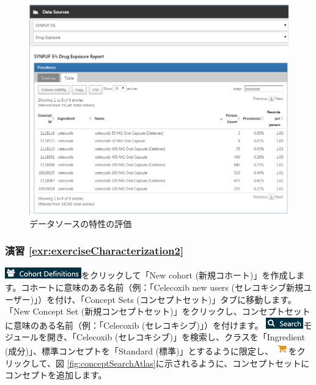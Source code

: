 \documentclass[
  11pt]{book}
\theoremstyle{definition}
\theoremstyle{definition}
\theoremstyle{definition}
\theoremstyle{definition}
\theoremstyle{remark}
\begin{document}
\begin{figure}

{\centering \includegraphics[width=1\linewidth]{images/SuggestedAnswers/dataSourcesAtlas} 

}

\caption{データソースの特性の評価}\label{fig:dataSourcesAtlas}
\end{figure}

\subsubsection*{演習 \ref{exr:exerciseCharacterization2}}\label{ux6f14ux7fd2-refexrexercisecharacterization2}

\includegraphics{images/Cohorts/cohortdefinition.png}をクリックして「New cohort (新規コホート)」を作成します。コホートに意味のある名前（例：「Celecoxib new users (セレコキシブ新規ユーザー)」）を付け、「Concept Sets (コンセプトセット)」タブに移動します。「New Concept Set (新規コンセプトセット)」をクリックし、コンセプトセットに意味のある名前（例：「Celecoxib (セレコキシブ)」）を付けます。 \includegraphics{images/Cohorts/search-2.png}モジュールを開き、「Celecoxib (セレコキシブ)」を検索し、クラスを「Ingredient (成分)」、標準コンセプトを「Standard (標準)」とするように限定し、 \includegraphics{images/Cohorts/shoppingcart.png}をクリックして、図 \ref{fig:conceptSearchAtlas}に示されるように、コンセプトセットにコンセプトを追加します。
\end{document}
